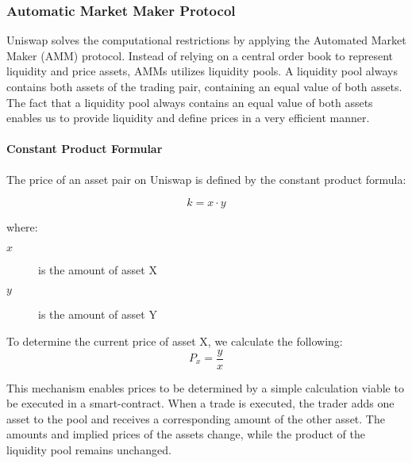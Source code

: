 \documentclass[../../thesis.tex]{subfiles}
\begin{document}
\subsubsection{Automatic Market Maker Protocol}
Uniswap solves the computational restrictions by applying the Automated Market Maker (AMM) protocol. Instead of relying on a central order book to represent liquidity and price assets, AMMs utilizes liquidity pools. A liquidity pool always contains both assets of the trading pair, containing an equal value of both assets. The fact that a liquidity pool always contains an equal value of both assets enables us to provide liquidity and define prices in a very efficient manner. 
\paragraph{Constant Product Formular}
The price of an asset pair on Uniswap is defined by the constant product formula:

\[ k = x\cdot y \]

where:
\begin{description}
\item[$x$] is the amount of asset X
\item[$y$] is the amount of asset Y
\end{description}

To determine the current price of asset X, we calculate the following:
\[ P_{x} = \frac{y}{x} \]

This mechanism enables prices to be determined by a simple calculation viable to be executed in a smart-contract. When a trade is executed, the trader adds one asset to the pool and receives a corresponding amount of the other asset. The amounts and implied prices of the assets change, while the product of the liquidity pool remains unchanged. 
\end{document}
